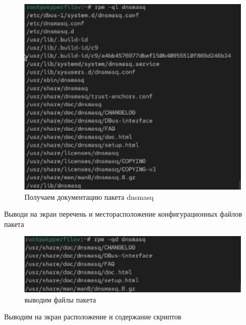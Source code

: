 \documentclass[
  english,
  russian,
  12pt,
  a4paper,
  DIV=11,
  numbers=noendperiod]{scrreprt}
\begin{document}
\begin{figure}

{\centering \includegraphics[width=0.71\linewidth,height=\textheight,keepaspectratio]{image/37.jpg}

}

\caption{Получаем документацию пакета dnsmasq}

\end{figure}%

Выводи на экран перечень и месторасположение конфигурационных файлов
пакета

\begin{figure}

{\centering \includegraphics[width=0.71\linewidth,height=\textheight,keepaspectratio]{image/38.jpg}

}

\caption{выводим файлы пакета}

\end{figure}%

Выводим на экран расположение и содержание скриптов
\end{document}
